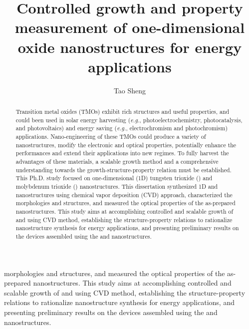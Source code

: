 \documentclass[12pt,oneside]{book}
\begin{document}
\title{Controlled growth and property measurement of one-dimensional oxide nanostructures for energy applications}
  \author{Tao Sheng}
  \thesisyear{\the\year}



\maketitle
\begin{abstract}
Transition metal oxides (TMOs) exhibit rich structures and useful properties, and could been used in solar energy harvesting (\emph{e.g.}, photoelectrochemistry, photocatalysis, and photovoltaics) and energy saving (\emph{e.g.}, electrochromism and photochromism) applications. Nano-engineering of these TMOs could produce a variety of nanostructures, modify the electronic and optical properties, potentially enhance the performances and extend their applications into new regimes. To fully harvest the advantages of these materials, a scalable growth method and a comprehensive understanding towards the growth-structure-property relation must be established. This Ph.D. study focused on one-dimensional (1D) tungsten trioxide () and molybdenum trioxide () nanostructures. This dissertation synthesized 1D  and  nanostructures using chemical vapor deposition (CVD) approach, characterized the morphologies and structures, and measured the optical properties of the as-prepared nanostructures. This study aims at accomplishing controlled and scalable growth of  and  using CVD method, establishing the structure-property relations to rationalize nanostructure synthesis for energy applications, and presenting preliminary results on the devices assembled using the  and  nanostructures.

\end{abstract}

\begin{dedication}
morphologies and structures, and measured the optical properties of the as-prepared nanostructures. This study aims at accomplishing controlled and scalable growth of  and  using CVD method, establishing the structure-property relations to rationalize nanostructure synthesis for energy applications, and presenting preliminary results on the devices assembled using the  and  nanostructures.

\end{dedication}
\end{document}
